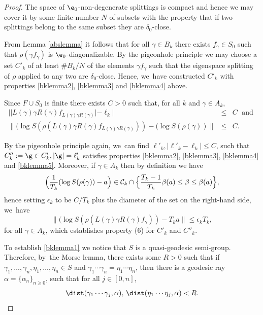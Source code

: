 \begin{proof}
The space of \(\e_0\)-non-degenerate splittings is compact and hence we may cover it by some finite number \(N\) of subsets with the property that if two splittings belong to the same subset they are \(\delta_0\)-close.

From Lemma \ref{abslemma} it follows that for all \(\gamma \in B_k\) there exists \(f_\gamma \in S_0\) such that \(\rho(\gamma f_\gamma)\) is \(\e_0\)-diagonalizable. By the pigeonhole principle we may choose a set \(C'_k\) of at least \(\# B_k /N\) of the elements \(\gamma f_{\gamma}\) such that the eigenspace splitting of \(\rho\) applied to any two are \(\delta_0\)-close.
Hence, we~have constructed \(C'_k\) with properties \eqref{bklemma2}, \eqref{bklemma3} and \eqref{bklemma4} above.

Since \(F \cup S_0\) is finite there exists \(C > 0\) such that, for all \(k\) and \(\gamma \in A_k\),
\begin{eqnarray*} | |L(\gamma)\gamma R(\gamma) f_{L(\gamma)\gamma R(\gamma)}| - \ell_k | &\le &C \; {\textrm { and }}\\
\|(\log S(\rho(L(\gamma)\gamma R(\gamma) f_{L(\gamma)\gamma R(\gamma)})) - (\log S(\rho(\gamma))\| &\le &C.\end{eqnarray*}

By the pigeonhole principle again, we~can find \(\ell'_k, | \ell '_k - \ell_k | \le C\), such that \(C''_k : = \g \in C'_k, |\g | = \ell '_k \) satisfies properties \eqref{bklemma2}, \eqref{bklemma3}, \eqref{bklemma4} and \eqref{bklemma5}. Moreover,
if \(\gamma \in A_k\) then by definition we have
\[
\Bigl(\frac{1}{T_k}(\log S(\rho(\gamma))- a\Bigr) \in \mathcal{C}_k \cap \Bigl\lbrace \frac{T_k - 1}{T_k}\beta(a) \le \beta \le \beta(a)\Bigr\rbrace,
\]
hence setting \(\epsilon_k\) to be \(C/T_k\) plus the diameter of the set on the right-hand side, we~have
\[
\|(\log S(\rho(L(\gamma)\gamma R(\gamma) f_\gamma))- T_k a\| \le \epsilon_k T_k,
\]
for all \(\gamma \in A_k\), which establishes property (6) for \(C'_k\) and \(C''_k\).

To establish \eqref{bklemma1} we notice that \(S\) is a quasi-geodesic semi-group. Therefore, by~the Morse lemma, there exists some \(R > 0\) such that if \(\gamma_1,\ldots, \gamma_n, \eta_1,\ldots,\eta_n \in S\) and \(\gamma_1\cdots \gamma_n = \eta_1\cdots \eta_n\), then there is a geodesic ray \(\alpha = \{\alpha_n \}_{ n \ge 0}\), such that for all \(j \in [0, n]\), \begin{equation}\label{tracking}\dist(\gamma_1\cdots \gamma_j, \alpha), \, \dist (\eta_1\cdots \eta_j, \alpha) < R.\end{equation}


\end{proof}
